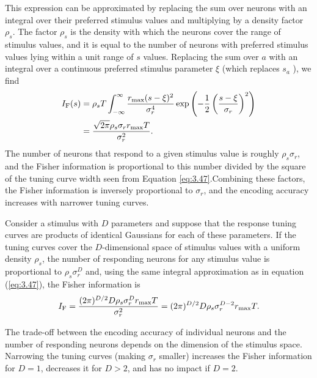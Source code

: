 \begin{prop}

This expression can be approximated by replacing the sum over neurons
with an integral over their preferred stimulus values and multiplying by a
density factor $\rho_{s}$. The factor $\rho_{s}$ is the density with which the neurons cover
the range of stimulus values, and it is equal to the number of neurons with
preferred stimulus values lying within a unit range of $s$ values. Replacing
the sum over $a$ with an integral over a continuous preferred stimulus parameter $\xi$ (which replaces $s_{a}$ ), we find
\begin{equation}
  \begin{aligned}
    \label{eq:3.47}
   I_{\rm{F}}(s)&=\rho_{s}T\int_{-\infty}^{\infty}{\frac{r_{\max}(s-\xi)^{2}}{\sigma_r^4}\exp\left(-\frac{1}{2}\left( \frac{s-\xi}{\sigma_r}\right)^{2} \right)}\\
                  &=\frac{\sqrt{2\pi}\rho_{s}\sigma_rr_{\max}T}{\sigma_r^2}.
  \end{aligned}
\end{equation}
The number of neurons that respond to a given stimulus value is
roughly $\rho_{s}\sigma_r$, and the Fisher information is proportional to this number divided by the square of the
tuning curve width seen from Equation \ref{eq:3.47}.Combining these factors, the Fisher information is inversely proportional to $\sigma_{r}$, and the encoding accuracy increases with narrower tuning curves.
\end{prop}

\begin{prop}
  Consider a stimulus with
$D$ parameters and suppose that the response tuning curves are products
of identical Gaussians for each of these parameters. If the tuning curves
cover the $D$-dimensional space of stimulus values with a uniform density $\rho_{s}$, the number of responding neurons for any stimulus value is proportional to $\rho_{s}\sigma_r^{D}$ and, using the same integral approximation as in equation (\ref{eq:3.47}), the Fisher information is
\begin{equation}
  I_{\rm{F}}=\frac{(2\pi)^{D/2}D\rho_{s}\sigma_r^{D}r_{\max}T}{\sigma_r^2}=(2\pi)^{D/2}D\rho_{s}\sigma_r^{D-2}r_{\max}T.
\end{equation}
\end{prop}

\begin{rem}
  The trade-off between the encoding accuracy of individual neurons and the
number of responding neurons depends on the dimension of the stimulus space. Narrowing the tuning curves (making $\sigma_{r}$ smaller) increases the
Fisher information for $D=1$, decreases it for $D > 2$, and has no impact if
$D = 2$.
\end{rem}

